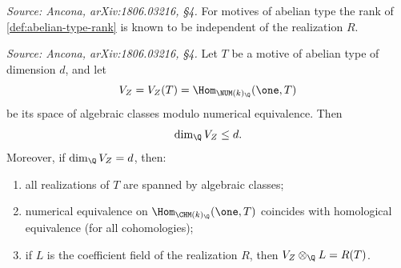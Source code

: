 \begin{remark}
  \label{rem:rank-indep}
  \textit{Source: Ancona, arXiv:1806.03216, §4.}
  For motives of abelian type the rank of \cref{def:abelian-type-rank} is known
  to be independent of the realization \(R\).
\end{remark}

\begin{proposition}
  \label{prop:motive-num-bound}
  \textit{Source: Ancona, arXiv:1806.03216, §4.}
  Let \(T\) be a motive of abelian type of dimension \(d\), and let
  \[V_Z = V_Z(T) = \Hom_{\NUM(k)_\Q}(\one, T)\]
  be its space of algebraic classes modulo numerical equivalence. Then
  \[\dim_\Q V_Z \le d.\]
  Moreover, if \(\dim_\Q V_Z = d\), then:
  \begin{enumerate}
    \item all realizations of \(T\) are spanned by algebraic classes;
    \item numerical equivalence on \(\Hom_{\CHM(k)_\Q}(\one, T)\) coincides with
      homological equivalence (for all cohomologies);
    \item if \(L\) is the coefficient field of the realization \(R\), then
      \(V_Z \otimes_\Q L = R(T)\).
  \end{enumerate}
\end{proposition}

